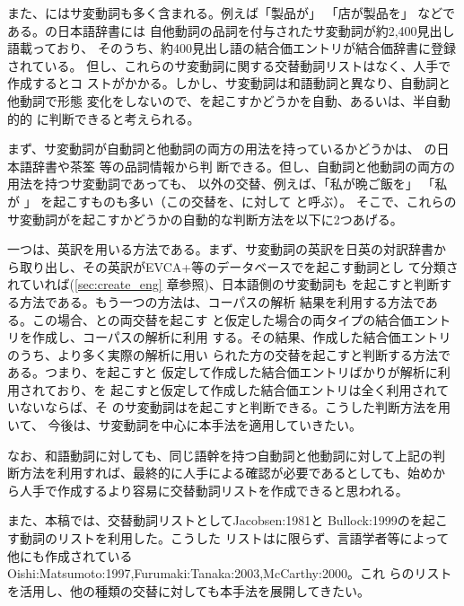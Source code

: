 \documentclass[japanese]{jnlp}
\newcommand{\ul}[1]{}
\newcommand{\soalt}{}
\newcommand{\saalt}{}
\newcommand{\citep}{}
\newcommand{\citet}{}
\newcommand{\altje}{}
\def\mpt#1{}
\renewcommand{\mpt}[1]{}
\newcommand{\tot}{}
\begin{document}
\mpt{対象を増やすための手段}

また、\soalt にはサ変動詞も多く含まれる。例えば「製品が\ul{完売した}」
\tot{}「店が製品を\ul{完売した}」 などである。\altje の日本語辞書には
自他動詞の品詞を付与されたサ変動詞が約2,400見出し語載っており、
そのうち、約400見出し語の結合価エントリが結合価辞書に登録されている。
但し、これらのサ変動詞に関する交替動詞リストはなく、人手で作成するとコ
ストがかかる。しかし、サ変動詞は和語動詞と異なり、自動詞と他動詞で形態
変化をしないので、\soalt{}を起こすかどうかを自動、あるいは、半自動的的
に判断できると考えられる。

まず、サ変動詞が自動詞と他動詞の両方の用法を持っているかどうかは、
\altje の日本語辞書や茶筌\cite{chasen:2.3.3j}
等の品詞情報から判
断できる。但し、自動詞と他動詞の両方の用法を持つサ変動詞であっても、
\soalt{}以外の交替、例えば、「私が晩ご飯を\ul{料理した}」 \tot 「私が
\ul{料理した}」 を起こすものも多い（この交替を、\soalt{}に対して
\saalt{}と呼ぶ）。
そこで、これらのサ変動詞が\soalt{}を起こすかどうかの自動的な判断方法を以下に2つあげる。

一つは、英訳を用いる方法である。まず、サ変動詞の英訳を日英の対訳辞書か
ら取り出し、その英訳がEVCA+等のデータベースで\soalt{}を起こす動詞とし
て分類されていれば(\ref{sec:create_eng} 章参照)、日本語側のサ変動詞も
\soalt{}を起こすと判断する方法である。もう一つの方法は、コーパスの解析
結果を利用する方法である。この場合、\soalt{}と\saalt{}の両交替を起こす
と仮定した場合の両タイプの結合価エントリを作成し、コーパスの解析に利用
する。その結果、作成した結合価エントリのうち、より多く実際の解析に用い
られた方の交替を起こすと判断する方法である。つまり、\soalt{}を起こすと
仮定して作成した結合価エントリばかりが解析に利用されており、\saalt{}を
起こすと仮定して作成した結合価エントリは全く利用されていないならば、そ
のサ変動詞は\soalt{}を起こすと判断できる。こうした判断方法を用いて、
今後は、サ変動詞を中心に本手法を適用していきたい。

なお、和語動詞に対しても、同じ語幹を持つ自動詞と他動詞に対して上記の判
断方法を利用すれば、最終的に人手による確認が必要であるとしても、始めか
ら人手で作成するより容易に交替動詞リストを作成できると思われる。


\mpt{他の交替や和語動詞でも、自動的に交替動詞リストを拡張できないか？ NH}

また、本稿では、交替動詞リストとして\citet{Jacobsen:1981}と
\citet{Bullock:1999}の\soalt{}を起こす動詞のリストを利用した。こうした
リストは\soalt{}に限らず、言語学者等によって他にも作成されている
\citep{Oishi:Matsumoto:1997,Furumaki:Tanaka:2003,McCarthy:2000}。これ
らのリストを活用し、他の種類の交替に対しても本手法を展開してきたい。
\end{document}
